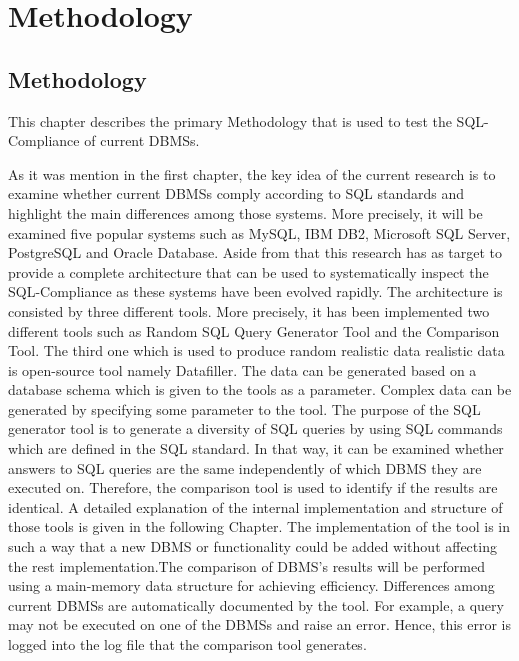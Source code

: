 
\chapter{Methodology}

\section{Methodology}
 
This chapter describes the primary Methodology that is used to test the SQL-Compliance of current DBMSs. 

As it was mention in the first chapter, the key idea of the current research is to examine whether current DBMSs comply according to SQL standards and highlight the main differences among those systems. More precisely, it will be examined five popular systems such as MySQL, IBM DB2, Microsoft SQL Server, PostgreSQL and Oracle Database. Aside from that this research has as target  to provide a complete architecture that can be used to systematically inspect the SQL-Compliance as these systems have been evolved rapidly. The architecture is consisted by three different tools. More precisely, it has been implemented two different tools such as Random SQL Query Generator Tool and the Comparison Tool. The third one which is used to produce random realistic data realistic data is open-source tool namely Datafiller. The data can be generated based on a database schema which is given to the tools as a parameter. Complex data can be generated by specifying some parameter to the tool.  The purpose of the SQL generator tool is to generate a diversity of SQL queries by using SQL commands which are defined in the SQL standard. In that way, it can be examined whether answers to SQL queries are the same independently of which DBMS they are executed on. Therefore, the comparison tool is used to identify if the results are identical. A detailed explanation of the internal implementation and structure of those tools is given in the following Chapter. The implementation of the tool is in such a way that a new DBMS or functionality could be added without affecting the rest implementation.The comparison of DBMS’s results will be performed using a main-memory data structure for achieving efficiency. Differences among current DBMSs are automatically documented by the tool. For example, a query may not be executed on one of the DBMSs and raise an error. Hence, this error is logged into the log file that the comparison tool generates. 








 